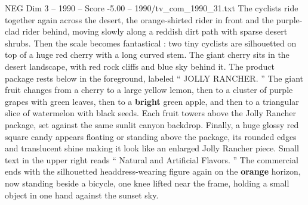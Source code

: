 \begin{textsample}{NEG Dim 3 – 1990 – Score -5.00 – 1990/tv\_com\_1990\_31.txt}
The cyclists ride together again across the desert, the orange-shirted rider in front and the purple-clad rider behind, moving slowly along a reddish dirt path with sparse desert shrubs.
Then the scale becomes fantastical : two tiny cyclists are silhouetted on top of a huge red cherry with a long curved stem.
The giant cherry sits in the desert landscape, with red rock cliffs and blue sky behind it.
The product package rests below in the foreground, labeled “ JOLLY RANCHER. ” The giant fruit changes from a cherry to a large yellow lemon, then to a cluster of purple grapes with green leaves, then to a \textbf{bright} green apple, and then to a triangular slice of watermelon with black seeds.
Each fruit towers above the Jolly Rancher package, set against the same sunlit canyon backdrop.
Finally, a huge glossy red square candy appears floating or standing above the package, its rounded edges and translucent shine making it look like an enlarged Jolly Rancher piece.
Small text in the upper right reads “ Natural and Artificial Flavors. ” The commercial ends with the silhouetted headdress-wearing figure again on the \textbf{orange} horizon, now standing beside a bicycle, one knee lifted near the frame, holding a small object in one hand against the sunset sky.

\end{textsample}
